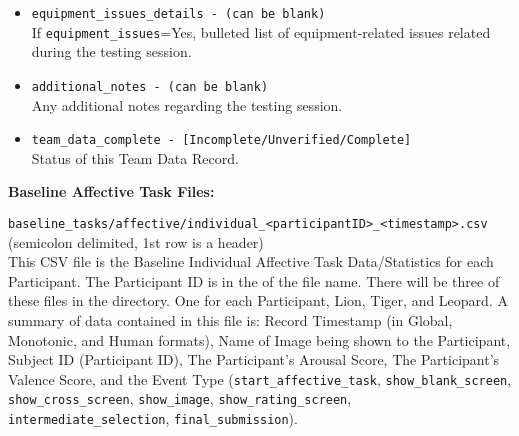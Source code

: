 \begin{description}
\begin{itemize}
    \item \verb|equipment_issues_details - (can be blank)|\\If \verb|equipment_issues|=Yes, bulleted list of equipment-related issues related during the testing session.
    \item \verb|additional_notes - (can be blank)|\\Any additional notes regarding the testing session.
    \item \verb|team_data_complete - [Incomplete/Unverified/Complete]|\\Status of this Team Data Record.
\end{itemize}

\bigskip\item\textbf{Baseline Affective Task Files:}
\medskip
\item\verb|baseline_tasks/affective/individual_<participantID>_<timestamp>.csv|\\(semicolon delimited, 1st row is a header)\\
This CSV file is the Baseline Individual Affective Task Data/Statistics for
each Participant. The Participant ID is in the of the file name. There will be
three of these files in the directory. One for each Participant, Lion, Tiger,
and Leopard. A summary of data contained in this file is: Record Timestamp (in
Global, Monotonic, and Human formats), Name of Image being shown to the
Participant, Subject ID (Participant ID), The Participant's Arousal Score, The
Participant's Valence Score, and the Event Type (\verb|start_affective_task|,
\verb|show_blank_screen|, \verb|show_cross_screen|, \verb|show_image|,
\verb|show_rating_screen|, \verb|intermediate_selection|,
\verb|final_submission|).


\end{description}
